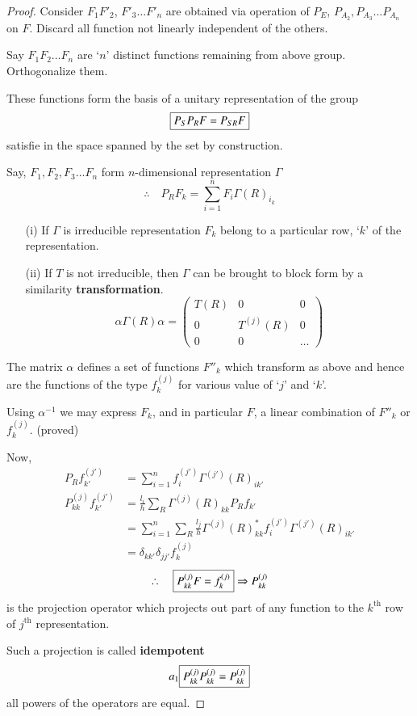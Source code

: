 \begin{proof}
Consider $F_{1}F'_{2}$, $F'_{3}\ldots F'_{n}$ are obtained via operation of $P_{E}$, $P_{A_{2}},P_{A_{3}}\ldots P_{A_{n}}$ on $F$. Discard all function not linearly independent of the others.

Say $F_{1}F_{2}\ldots F_{n}$ are `$n$' distinct functions remaining from above group. Orthogonalize them.

These functions form the basis of a unitary representation of the group 
$$
\fbox{$P_{S}P_{R}F=P_{SR}F$} 
$$
satisfie in the space spanned by the set by construction.

Say, $F_{1},F_{2},F_{3}\ldots F_{n}$ form $n$-dimensional representation $\Gamma$
$$
\therefore\quad P_{R}F_{k}=\sum\limits^{n}_{i=1}F_{i}\Gamma(R)_{i_{k}}
$$
\begin{itemize}
\item[(i)] If $\Gamma$ is irreducible representation $F_{k}$ belong to a particular row, `$k$' of the representation.

\item[(ii)] If $T$ is not irreducible, then $\Gamma$ can be brought to block form by a similarity {\bf transformation}.
\begin{equation*}
\alpha\Gamma(R)\alpha =
\left(
\begin{matrix}
T(R) & 0 & 0\\
0 & T^{(j)}(R) & 0\\
0 & 0 & \ldots
\end{matrix}
\right)\tag{A}\label{lec9-eqA}
\end{equation*}
\end{itemize}

The matrix $\alpha$ defines a set of functions $F''_{k}$ which transform as above and hence are the functions of the type $f^{(j)}_{k}$ for various value of `$j$' and `$k$'.

Using $\alpha^{-1}$ we may express $F_{k}$, and in particular $F$, a linear combination of $F''_{k}$ or $f^{(j)}_{k}$. (proved)

Now,
\begin{align*}
P_{R}f^{(j')}_{k'} &= \sum\limits^{n}_{i=1}f_{i}^{(j')}\Gamma^{(j')}(R)_{ik'}\\
P^{(j)}_{kk}f^{(j')}_{k'} &= \frac{l_{i}}{h}\sum\limits_{R}\Gamma^{(j)}(R)_{kk}P_{R}f_{k'}\\
&= \sum\limits^{n}_{i=1}\sum\limits_{R}\frac{l_{j}}{h}\Gamma^{(j)}(R)^{*}_{kk}f^{(j')}_{i}\Gamma^{(j')}(R)_{ik'}\\
&= \delta_{kk'}\delta_{jj'}f^{(j)}_{k}
\end{align*}
$$
\therefore\quad \fbox{$P^{(j)}_{kk}F=f^{(j)}_{k}$}\Rightarrow P^{(j)}_{kk}
$$
is the projection operator which projects out part of any function to the $k^{\text{th}}$ row of $j^{\text{th}}$ representation.

Such a projection is called {\bf idempotent}
$$
a_{1}\fbox{$P^{(j)}_{kk}P^{(j)}_{kk}=P^{(j)}_{kk}$}
$$
all powers of the operators are equal.
\end{proof}


